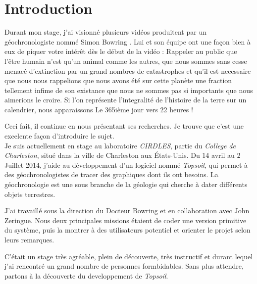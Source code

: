 \chapter{Introduction}

Durant mon stage, j'ai visionné plusieurs vidéos produitent par un géochronologiste nommé Simon Bowring%
. Lui et son équipe ont une façon bien à eux de piquer votre intérêt dès le début de la vidéo : Rappeler au public que l'être humain n'est qu'un animal comme les autres, que nous sommes sans cesse menacé d'extinction par un grand nombres de catastrophes et qu'il est necessaire que nous nous rappelions que nous avons été sur cette planète une fraction tellement infime de son existance que nous ne sommes pas si importants que nous aimerions le croire. Si l'on représente l'integralité de l'histoire de la terre sur un calendrier, nous apparaissons Le 365ième jour vers 22 heures !

Ceci fait, il continue en nous présentant ses recherches. Je trouve que c'est une excelente façon d'introduire le sujet.\\

Je suis actuellement en stage au laboratoire \textit{CIRDLES}, partie du \textit{College de Charleston}, situé dans la ville de Charleston aux États-Unis. %
Du 14 avril au 2 Juillet 2014, j'aide au développement d'un logiciel nommé \textit{Topsoil}, qui permet à des géochronologistes de tracer des graphiques dont ils ont besoins. La géochronologie est une sous branche de la géologie qui cherche à dater différents objets terrestres. 

J'ai travaillé sous la direction du Docteur Bowring et en collaboration avec John Zeringue. Nous deux principales missions étaient de coder une version primitive du système, puis la montrer à des utilisateurs potentiel et orienter le projet selon leurs remarques.

C'était un stage très agréable, plein de découverte, très instructif et durant lequel j'ai rencontré un grand nombre de personnes formbidables. Sans plus attendre, partons à la découverte du developpement de \textit{Topsoil}.
